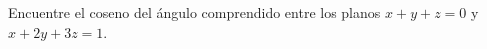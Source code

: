 \item Encuentre el coseno del ángulo comprendido entre los planos $x + y + z = 0$ y $x + 2y + 3z = 1$.
